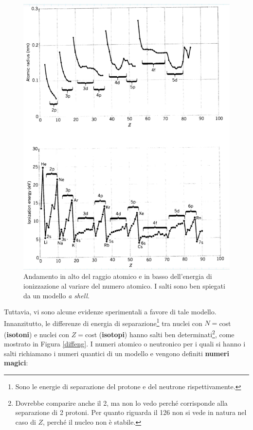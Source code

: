 \begin{figure}[!h]
    \centering
    \includegraphics[scale=0.23]{Immagini/ratm-Eion.png}
    \caption{Andamento in alto del raggio atomico e in basso dell'energia di ionizzazione al variare del numero atomico. I salti sono ben spiegati da un modello \textit{a shell}.}
    \label{0301_rE}
\end{figure}
\newline
Tuttavia, vi sono alcune evidenze sperimentali a favore di tale modello. Innanzitutto, le differenze di energia di separazione\footnote{Sono le energie di separazione del protone e del neutrone rispettivamente.} tra nuclei con $N=$cost (\textbf{isotoni}) e nuclei con $Z=$cost (\textbf{isotopi}) hanno salti ben determinati\footnote{Dovrebbe comparire anche il 2, ma non lo vedo perché corrisponde alla separazione di 2 protoni. Per quanto riguarda il 126 non si vede in natura nel caso di $Z$, perché il nucleo non è stabile.}, come mostrato in Figura \ref{diffeng}. I numeri atomico o neutronico per i quali si hanno i salti richiamano i numeri quantici di un modello  e vengono definiti \textbf{numeri magici}:
